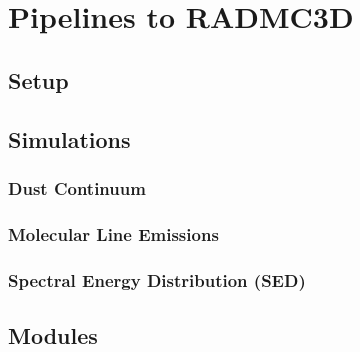 \documentclass[a4paper,11pt,english]{sphinxmanual}
\begin{document}
\sphinxstepscope


\chapter{Pipelines to RADMC\sphinxhyphen{}3D}
\label{\detokenize{radmc3d:pipelines-to-radmc-3d}}\label{\detokenize{radmc3d::doc}}

\section{Setup}
\label{\detokenize{radmc3d:setup}}

\section{Simulations}
\label{\detokenize{radmc3d:simulations}}

\subsection{Dust Continuum}
\label{\detokenize{radmc3d:dust-continuum}}

\subsection{Molecular Line Emissions}
\label{\detokenize{radmc3d:molecular-line-emissions}}

\subsection{Spectral Energy Distribution (SED)}
\label{\detokenize{radmc3d:spectral-energy-distribution-sed}}

\section{Modules}
\label{\detokenize{radmc3d:modules}}
\end{document}
